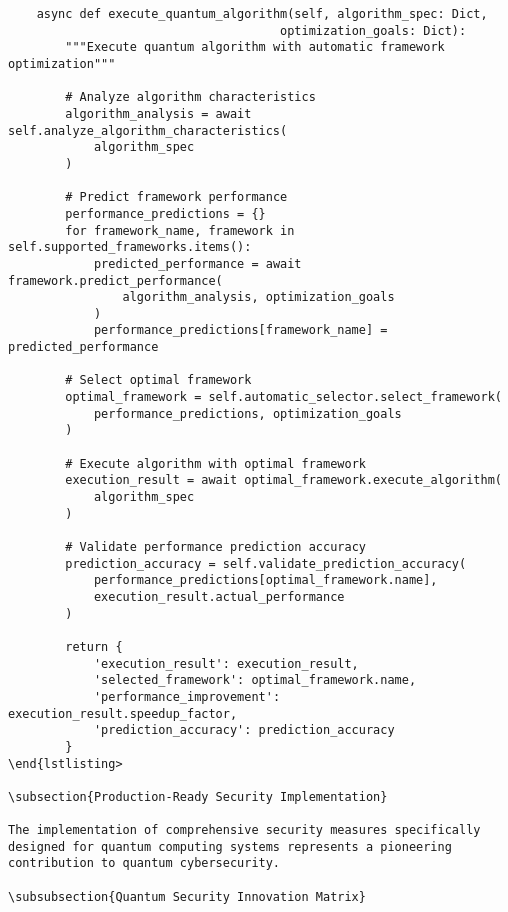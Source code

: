 \documentclass[12pt,a4paper]{report}
\begin{document}
\begin{lstlisting}
    async def execute_quantum_algorithm(self, algorithm_spec: Dict,
                                      optimization_goals: Dict):
        """Execute quantum algorithm with automatic framework optimization"""

        # Analyze algorithm characteristics
        algorithm_analysis = await self.analyze_algorithm_characteristics(
            algorithm_spec
        )

        # Predict framework performance
        performance_predictions = {}
        for framework_name, framework in self.supported_frameworks.items():
            predicted_performance = await framework.predict_performance(
                algorithm_analysis, optimization_goals
            )
            performance_predictions[framework_name] = predicted_performance

        # Select optimal framework
        optimal_framework = self.automatic_selector.select_framework(
            performance_predictions, optimization_goals
        )

        # Execute algorithm with optimal framework
        execution_result = await optimal_framework.execute_algorithm(
            algorithm_spec
        )

        # Validate performance prediction accuracy
        prediction_accuracy = self.validate_prediction_accuracy(
            performance_predictions[optimal_framework.name],
            execution_result.actual_performance
        )

        return {
            'execution_result': execution_result,
            'selected_framework': optimal_framework.name,
            'performance_improvement': execution_result.speedup_factor,
            'prediction_accuracy': prediction_accuracy
        }
\end{lstlisting>

\subsection{Production-Ready Security Implementation}

The implementation of comprehensive security measures specifically designed for quantum computing systems represents a pioneering contribution to quantum cybersecurity.

\subsubsection{Quantum Security Innovation Matrix}


\end{lstlisting}
\end{document}
